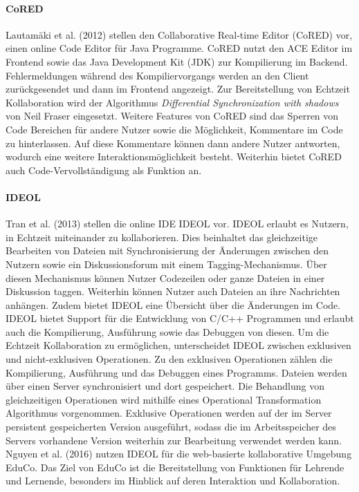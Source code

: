 \paragraph{CoRED}
Lautamäki et al. (2012) \cite{lautamaki_cored_2012} stellen den Collaborative Real-time Editor (CoRED) vor, einen online Code Editor für Java Programme. CoRED nutzt den ACE Editor \cite{noauthor_ace_nodate} im Frontend sowie das Java Development Kit (JDK) \cite{noauthor_jdk_nodate} zur Kompilierung im Backend. Fehlermeldungen während des Kompiliervorgangs werden an den Client zurückgesendet und dann im Frontend angezeigt. Zur Bereitstellung von Echtzeit Kollaboration wird der Algorithmus \textit{Differential Synchronization with shadows} \cite{fraser_differential_2009} von Neil Fraser eingesetzt. Weitere Features von CoRED sind das Sperren von Code Bereichen für andere Nutzer sowie die Möglichkeit, Kommentare im Code zu hinterlassen. Auf diese Kommentare können dann andere Nutzer antworten, wodurch eine weitere Interaktionsmöglichkeit besteht. Weiterhin bietet CoRED auch Code-Vervollständigung als Funktion an.

\paragraph{IDEOL}
Tran et al. (2013) \cite{tran_interactive_2013} stellen die online IDE IDEOL vor. IDEOL erlaubt es Nutzern, in Echtzeit miteinander zu kollaborieren. Dies beinhaltet das gleichzeitige Bearbeiten von Dateien mit Synchronisierung der Änderungen zwischen den Nutzern sowie ein Diskussionsforum mit einem Tagging-Mechanismus. Über diesen Mechanismus können Nutzer Codezeilen oder ganze Dateien in einer Diskussion taggen. Weiterhin können Nutzer auch Dateien an ihre Nachrichten anhängen. Zudem bietet IDEOL eine Übersicht über die Änderungen im Code. IDEOL bietet Support für die Entwicklung von C/C++ Programmen und erlaubt auch die Kompilierung, Ausführung sowie das Debuggen von diesen. Um die Echtzeit Kollaboration zu ermöglichen, unterscheidet IDEOL zwischen exklusiven und nicht-exklusiven Operationen. Zu den exklusiven Operationen zählen die Kompilierung, Ausführung und das Debuggen eines Programms. Dateien werden über einen Server synchronisiert und dort gespeichert. Die Behandlung von gleichzeitigen Operationen wird mithilfe eines Operational Transformation Algorithmus \cite{sun_operational_1998} vorgenommen. Exklusive Operationen werden auf der im Server persistent gespeicherten Version ausgeführt, sodass die im Arbeitsspeicher des Servers vorhandene Version weiterhin zur Bearbeitung verwendet werden kann. Nguyen et al. (2016) \cite{nguyen_enhancing_2016} nutzen IDEOL für die web-basierte kollaborative Umgebung EduCo. Das Ziel von EduCo ist die Bereitstellung von Funktionen für Lehrende und Lernende, besonders im Hinblick auf deren Interaktion und Kollaboration.

